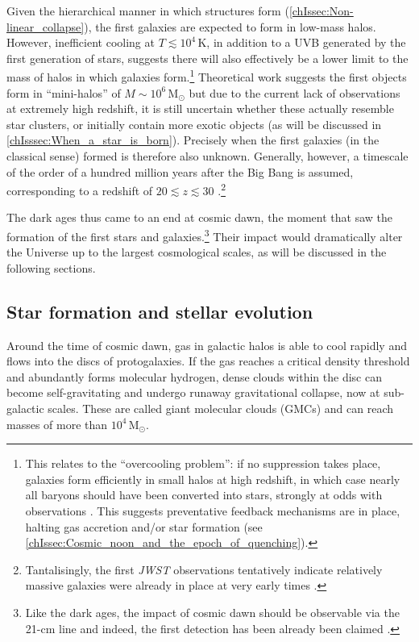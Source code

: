 Given the hierarchical manner in which structures form (\cref{chIssec:Non-linear_collapse}), the first galaxies are expected to form in low-mass halos. However, inefficient cooling at $T \lesssim 10^4 \, \mathrm{K}$, in addition to a UVB generated by the first generation of stars, suggests there will also effectively be a lower limit to the mass of halos in which galaxies form.\footnote{This relates to the ``overcooling problem'': if no suppression takes place, galaxies form efficiently in small halos at high redshift, in which case nearly all baryons should have been converted into stars, strongly at odds with observations \citep{1978MNRAS.183..341W}. This suggests preventative feedback mechanisms are in place, halting gas accretion and/or star formation (see \cref{chIssec:Cosmic_noon_and_the_epoch_of_quenching}).} Theoretical work suggests the first objects form in ``mini-halos'' of $M \sim 10^6 \, \mathrm{M_\odot}$ \citep{2013RPPh...76k2901B} but due to the current lack of observations at extremely high redshift, it is still uncertain whether these actually resemble star clusters, or initially contain more exotic objects (as will be discussed in \cref{chIsssec:When_a_star_is_born}). Precisely when the first galaxies (in the classical sense) formed is therefore also unknown. Generally, however, a timescale of the order of a hundred million years after the Big Bang is assumed, corresponding to a redshift of $20 \lesssim z \lesssim 30$ \citep[e.g.][]{2016ARA&A..54..761S}.\footnote{Tantalisingly, the first \textit{JWST} observations tentatively indicate relatively massive galaxies were already in place at very early times \citep{2022arXiv220712446L}.}

The dark ages thus came to an end at cosmic dawn, the moment that saw the formation of the first stars and galaxies.\footnote{Like the dark ages, the impact of cosmic dawn should be observable via the 21-cm line and indeed, the first detection has been already been claimed \citep{2018Natur.555...67B}.} Their impact would dramatically alter the Universe up to the largest cosmological scales, as will be discussed in the following sections.

\subsection{Star formation and stellar evolution}
\label{chIssec:Star_formation_and_stellar_evolution}

Around the time of cosmic dawn, gas in galactic halos is able to cool rapidly and flows into the discs of protogalaxies. If the gas reaches a critical density threshold and abundantly forms molecular hydrogen, dense clouds within the disc can become self-gravitating and undergo runaway gravitational collapse, now at sub-galactic scales. These are called giant molecular clouds (GMCs) and can reach masses of more than $10^4 \, \mathrm{M_\odot}$.

